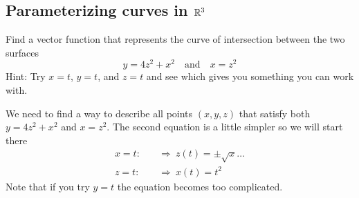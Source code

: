\documentclass[12pt]{exam}
\begin{document}
\begin{questions}

\newpage

\subsection*{Parameterizing curves in \(\mathbb{R}^3\)}

\question Find a vector function that represents the curve of intersection between the two surfaces 
\[
    y=4z^2+x^2 \quad\text{and}\quad x=z^2
\]
Hint: Try \(x=t\), \(y=t\), and \(z=t\) and see which gives you something you can work with.

    \ifprintanswers
            \begin{solution}
            We need to find a way to describe all points \((x,y,z)\) that satisfy both \(y=4z^2+x^2\) and \(x=z^2\). The second equation is a little simpler so we will start there
                 \begin{align*}
                    x=t:\quad & \Rightarrow ~ z(t)=\pm \sqrt{x}\ldots\\
                    z=t:\quad & \Rightarrow ~ x(t)=t^2
                \end{align*}
            Note that if you try \(y=t\) the equation becomes too complicated.


\end{solution}
\end{questions}
\end{document}

